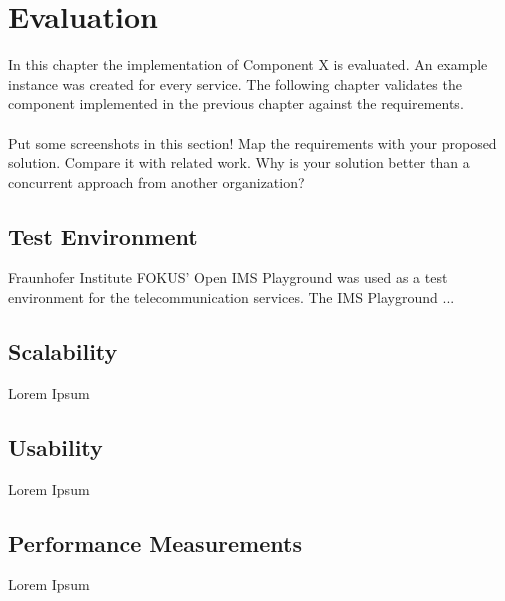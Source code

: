 \chapter{Evaluation\label{cha:chapter6}}

In this chapter the implementation of Component X is evaluated. An example instance was created for every service. The following chapter validates the component implemented in the previous chapter against the requirements.
\\
\\
Put some screenshots in this section! Map the requirements with your proposed solution. Compare it with related work. Why is your solution better than a concurrent approach from another organization?

\section{Test Environment\label{sec:testenvir}}

Fraunhofer Institute FOKUS' Open IMS Playground was used as a test environment for the telecommunication services. The IMS Playground ...

\section{Scalability\label{sec:scal}}

Lorem Ipsum

\section{Usability\label{sec:usab}}

Lorem Ipsum

\section{Performance Measurements\label{sec:performance}}

Lorem Ipsum